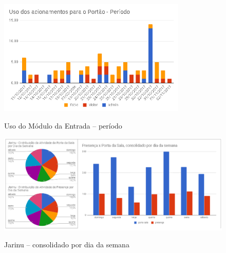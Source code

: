 \begin{figure}[H]
	\centering
	\caption{Uso do Módulo da Entrada -- período}
	\includegraphics[width=0.8\textwidth]{usoacessoperiodo}
	\label{fig:usoacessoperiodo}
\end{figure}

\begin{figure}[H]
	\centering
	\caption{Jarinu -- consolidado por dia da semana}
	\includegraphics[width=1.0\textwidth]{JarinuDiaSemana}
	\label{fig:JarinuDiaSemana}
\end{figure}
